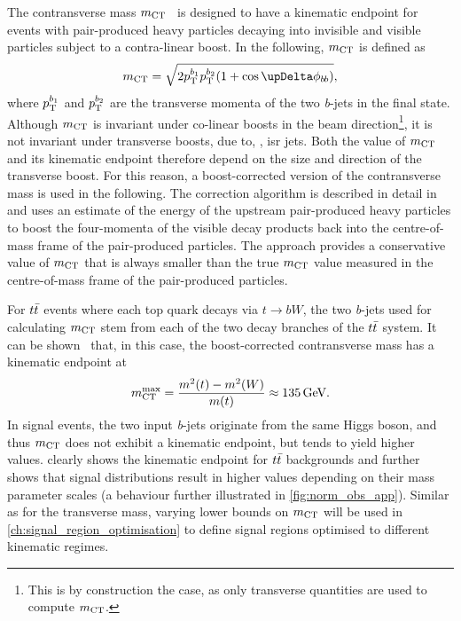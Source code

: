 The contransverse mass $m_{\textrm{CT}}$~\cite{Tovey:2008ui} is designed to have a kinematic endpoint for events with pair-produced heavy particles decaying into invisible and visible particles subject to a contra-linear boost. In the following, $m_{\textrm{CT}}$ is defined as
\begin{equation}
	\mct = \sqrt{2\pt^{b_1}\pt^{b_2}(1+\cos\upDelta\phi_{b\hspace{-0.06em}b})},
\end{equation}
where $p_{\mathrm{T}}^{b_1}$ and $p_{\mathrm{T}}^{b_2}$ are the transverse momenta of the two \textit{b}-jets in the final state. Although $m_{\textrm{CT}}$ is invariant under co-linear boosts in the beam direction\footnote{This is by construction the case, as only transverse quantities are used to compute $m_{\textrm{CT}}$.}, it is not invariant under transverse boosts, due to, \eg, \gls{isr} jets. Both the value of $m_{\textrm{CT}}$ and its kinematic endpoint therefore depend on the size and direction of the transverse boost. For this reason, a boost-corrected version of the contransverse mass is used in the following. The correction algorithm is described in detail in \cite{Polesello:2009rn} and uses an estimate of the energy of the upstream pair-produced heavy particles to boost the four-momenta of the visible decay products back into the centre-of-mass frame of the pair-produced particles. The approach provides a conservative value of $m_{\textrm{CT}}$ that is always smaller than the true $m_{\textrm{CT}}$ value measured in the centre-of-mass frame of the pair-produced particles.

For $t\bar{t}$ events where each top quark decays via $t\rightarrow bW$, the two \textit{b}-jets used for calculating $m_{\textrm{CT}}$ stem from each of the two decay branches of the $t\bar{t}$ system. It can be shown~\cite{Polesello:2009rn} that, in this case, the boost-corrected contransverse mass has a kinematic endpoint at
\begin{equation}
	\mct^\mathrm{max} = \frac{m^2(t) - m^2(W)}{m(t)} \approx \SI{135}{\GeV}.
\end{equation}
In signal events, the two input \textit{b}-jets originate from the same Higgs boson, and thus $m_{\textrm{CT}}$ does not exhibit a kinematic endpoint, but tends to yield higher values.  clearly shows the kinematic endpoint for $t\bar{t}$ backgrounds and further shows that signal distributions result in higher values depending on their mass parameter scales (a behaviour further illustrated in \cref{fig:norm_obs_app}). Similar  as for the transverse mass, varying lower bounds on $m_{\textrm{CT}}$ will be used in \cref{ch:signal_region_optimisation} to define signal regions optimised to different kinematic regimes. 


